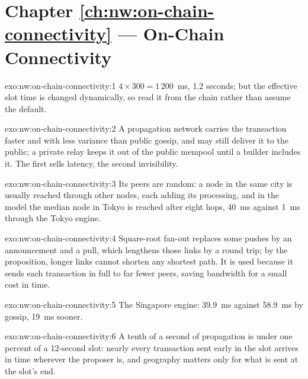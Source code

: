 \section*{Chapter \ref{ch:nw:on-chain-connectivity} --- On-Chain Connectivity}

\begin{solution}{exo:nw:on-chain-connectivity:1}
$4 \times 300 = 1\,200$~ms, 1.2 seconds; but the effective slot time is changed dynamically, so read it from the chain rather than assume the default.
\end{solution}

\begin{solution}{exo:nw:on-chain-connectivity:2}
A propagation network carries the transaction faster and with less variance than public gossip, and may still deliver it to the public; a private relay
keeps it out of the public mempool until a builder includes it. The first sells latency, the second invisibility.
\end{solution}

\begin{solution}{exo:nw:on-chain-connectivity:3}
Its peers are random: a node in the same city is usually reached through other nodes, each adding its processing, and in the model the median node in Tokyo is
reached after eight hops, \qty{40}{\milli\second} against \qty{1}{\milli\second} through the Tokyo engine.
\end{solution}

\begin{solution}{exo:nw:on-chain-connectivity:4}
Square-root fan-out replaces some pushes by an announcement and a pull, which lengthens those links by a round trip; by the proposition, longer links
cannot shorten any shortest path. It is used because it sends each transaction in full to far fewer peers, saving bandwidth for a small cost in time.
\end{solution}

\begin{solution}{exo:nw:on-chain-connectivity:5}
The Singapore engine: \qty{39.9}{\milli\second} against \qty{58.9}{\milli\second} by gossip, \qty{19}{\milli\second} sooner.
\end{solution}

\begin{solution}{exo:nw:on-chain-connectivity:6}
A tenth of a second of propagation is under one percent of a 12-second slot: nearly every transaction sent early in the slot arrives in time wherever the
proposer is, and geography matters only for what is sent at the slot's end.
\end{solution}


